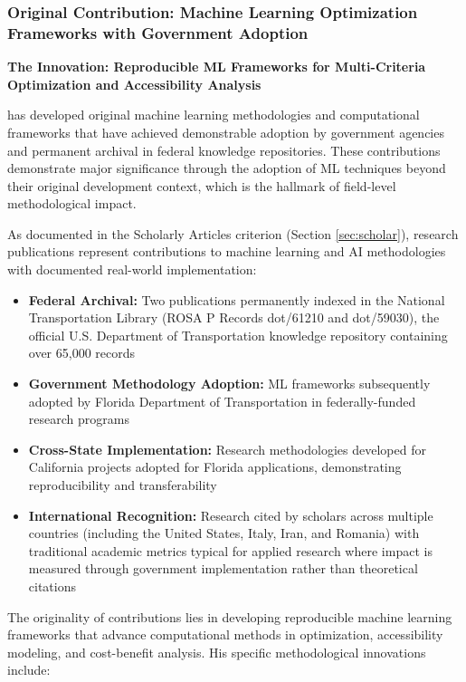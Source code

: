 
\subsubsection{Original Contribution: Machine Learning Optimization Frameworks with Government Adoption}
\label{original:research}

\textbf{The Innovation: Reproducible ML Frameworks for Multi-Criteria Optimization and Accessibility Analysis}

\dr has developed original machine learning methodologies and computational frameworks that have achieved demonstrable adoption by government agencies and permanent archival in federal knowledge repositories. These contributions demonstrate major significance through the adoption of ML techniques beyond their original development context, which is the hallmark of field-level methodological impact.

As documented in the Scholarly Articles criterion (Section \ref{sec:scholar}), \drs research publications represent contributions to machine learning and AI methodologies with documented real-world implementation:

\begin{itemize}
    \item \textbf{Federal Archival:} Two publications permanently indexed in the National Transportation Library (ROSA P Records dot/61210 and dot/59030), the official U.S. Department of Transportation knowledge repository containing over 65,000 records
    \item \textbf{Government Methodology Adoption:} ML frameworks subsequently adopted by Florida Department of Transportation in federally-funded research programs
    \item \textbf{Cross-State Implementation:} Research methodologies developed for California projects adopted for Florida applications, demonstrating reproducibility and transferability
    \item \textbf{International Recognition:} Research cited by scholars across multiple countries (including the United States, Italy, Iran, and Romania) with traditional academic metrics typical for applied research where impact is measured through government implementation rather than theoretical citations
\end{itemize}

The originality of \drs contributions lies in developing reproducible machine learning frameworks that advance computational methods in optimization, accessibility modeling, and cost-benefit analysis. His specific methodological innovations include:

